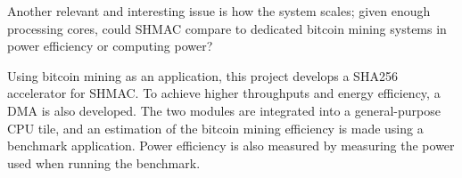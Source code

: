 Another relevant and interesting issue is how the system scales; given enough processing
cores, could SHMAC compare to dedicated bitcoin mining systems in power efficiency or
computing power?

Using bitcoin mining as an application, this project develops a SHA256 accelerator
for SHMAC. To achieve higher throughputs and energy efficiency, a DMA is also developed.
The two modules are integrated into a general-purpose CPU tile, and an estimation of the
bitcoin mining efficiency is made using a benchmark application. Power efficiency is
also measured by measuring the power used when running the benchmark.


